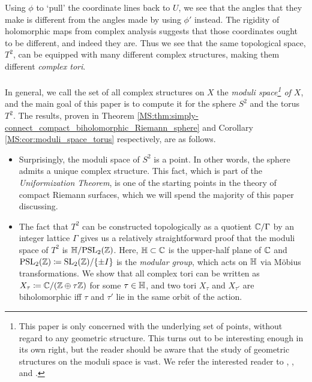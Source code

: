 \documentclass[../Moduli_Spaces_of_Riemann_Surfaces.tex]{subfiles}
\begin{document}
    Using $\phi$ to `pull' the coordinate lines back to $U$, we see that the angles that they make is different from the angles made by using $\phi'$ instead. The rigidity of holomorphic maps from complex analysis suggests that those coordinates ought to be different, and indeed they are. Thus we see that the same topological space, $T^2$, can be equipped with many different complex structures, making them different \textit{complex tori}.\\\ \\
    In general, we call the set of all complex structures on $X$ the \textit{moduli space\footnote{This paper is only concerned with the underlying set of points, without regard to any geometric structure. This turns out to be interesting enough in its own right, but the reader should be aware that the study of geometric structures on the moduli space is vast. We refer the interested reader to \cite{i&t}, \cite{farb}, and \cite{hubbard}.} of $X$}, and the main goal of this paper is to compute it for the sphere $S^2$ and the torus $T^2$. The results, proven in Theorem \ref{MS:thm:simply-connect_compact_biholomorphic_Riemann_sphere} and Corollary \ref{MS:cor:moduli_space_torus} respectively, are as follows.
    \begin{itemize}
        \item Surprisingly, the moduli space of $S^2$ is a point. In other words, the sphere admits a unique complex structure. This fact, which is part of the \textit{Uniformization Theorem}, is one of the starting points in the theory of compact Riemann surfaces, which we will spend the majority of this paper discussing.
            \vspace{-0.05in}
        \item The fact that $T^2$ can be constructed topologically as a quotient $\mathbb{C}/\Gamma$ by an integer lattice $\Gamma$ gives us a relatively straightforward proof that the moduli space of $T^2$ is $\mathbb{H}/\!\operatorname{PSL}_{2}\!\left(\mathbb{Z}\right)$. Here, $\mathbb{H}\subset\mathbb{C}$ is the upper-half plane of $\mathbb{C}$ and $\operatorname{PSL}_{2}\!\left(\mathbb{Z}\right)\coloneqq\operatorname{SL}_2\!\left(\mathbb{Z}\right)\!/\!\left\{\pm I\right\}$ is the \textit{modular group}, which acts on $\mathbb{H}$ via Möbius transformations. We show that all complex tori can be written as $X_\tau\coloneqq\mathbb{C}/\!\left(\mathbb{Z}\oplus\tau\mathbb{Z}\right)$ for some $\tau\in\mathbb{H}$, and two tori $X_\tau$ and $X_{\tau'}$ are biholomorphic iff $\tau$ and $\tau'$ lie in the same orbit of the action.
    \end{itemize}
\end{document}
